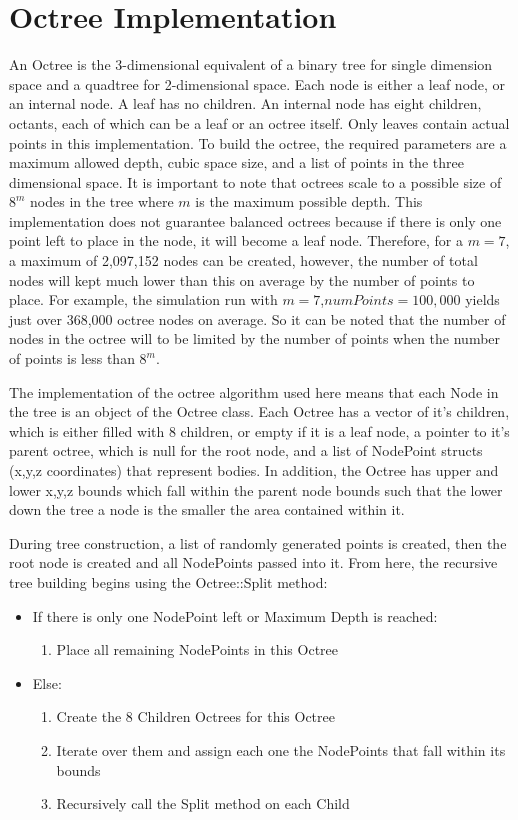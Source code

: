 \documentclass[11pt]{article}
\begin{document}
\section{Octree Implementation}
An Octree is the 3-dimensional equivalent of a binary tree for single dimension space and a quadtree for 2-dimensional space. Each node is either a leaf node, or an internal node. A leaf has no children. An internal node has eight children, octants, each of which can be a leaf or an octree itself. Only leaves contain actual points in this implementation. To build the octree, the required parameters are a maximum allowed depth, cubic space size, and a list of points in the three dimensional space. It is important to note that octrees scale to a possible size of \(8^{m}\) nodes in the tree where \(m\) is the maximum possible depth. This implementation does not guarantee balanced octrees because if there is only one point left to place in the node, it will become a leaf node. Therefore, for a \(m=7\), a maximum of 2,097,152 nodes can be created, however, the number of total nodes will kept much lower than this on average by the number of points to place. For example, the simulation run with \(m=7\),\(numPoints=100,000\) yields just over 368,000 octree nodes on average. So it can be noted that the number of nodes in the octree will to be limited by the number of points when the number of points is less than \(8^{m}\).

The implementation of the octree algorithm used here means that each Node in the tree is an object of the Octree class. Each Octree has a vector of it's children, which is either filled with 8 children, or empty if it is a leaf node, a pointer to it's parent octree, which is null for the root node, and a list of NodePoint structs (x,y,z coordinates) that represent bodies. In addition, the Octree has upper and lower x,y,z bounds which fall within the parent node bounds such that the lower down the tree a node is the smaller the area contained within it.

During tree construction, a list of randomly generated points is created, then the root node is created and all NodePoints passed into it. From here, the recursive tree building begins using the Octree::Split method:
\begin{itemize}
\item{If there is only one NodePoint left or Maximum Depth is reached:}
\begin{enumerate}
\item{Place all remaining NodePoints in this Octree}
\end{enumerate}
\item{Else:}
\begin{enumerate}
\item{Create the 8 Children Octrees for this Octree}
\item{Iterate over them and assign each one the NodePoints that fall within its bounds}
\item{Recursively call the Split method on each Child}
\end{enumerate}
\end{itemize}
\end{document}

